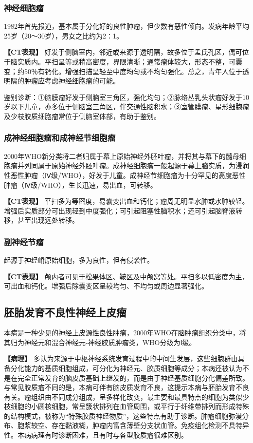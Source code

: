\subsubsection{神经细胞瘤}

1982年首先报道，基本属于分化好的良性肿瘤，但少数有恶性倾向。发病年龄平均25岁（20～30岁），男女之比约为2∶1。

\textbf{【CT表现】}
好发于侧脑室内，邻近或来源于透明隔，故多位于孟氏孔区，偶可位于脑实质内。平扫呈等或稍高密度，界限清晰；通常瘤体较大，形态不整，可囊变；约50％有钙化。增强扫描呈轻至中度均匀或不均匀强化。总之，青年人位于透明隔的肿瘤应考虑神经细胞瘤的可能。

鉴别诊断：①脑膜瘤好发于侧脑室三角区，强化均匀；②脉络丛乳头状瘤好发于10岁以下儿童，亦多位于侧脑室三角区，伴交通性脑积水；③室管膜瘤、星形细胞瘤及少枝胶质细胞瘤常位于侧脑室体部，有助于鉴别。

\subsubsection{成神经细胞瘤和成神经节细胞瘤}

2000年WHO新分类将二者归属于幕上原始神经外胚叶瘤，并将其与幕下的髓母细胞瘤并列同属于原始神经外胚叶瘤。成神经细胞瘤一般起源于幕上脑实质，为浸润性恶性肿瘤（Ⅳ级/WHO），好发于儿童。成神经节细胞瘤为十分罕见的高度恶性肿瘤（Ⅳ级/WHO），生长迅速，易出血，可转移。

\textbf{【CT表现】}
平扫多为等密度，易囊变出血和钙化；瘤周无明显水肿或水肿较轻。增强后实质部分可出现轻到中度强化；可引起阻塞性脑积水；还可引起脑脊液转移，甚至出现远处转移。

\subsubsection{副神经节瘤}

起源于神经嵴原始细胞，多为良性，但有侵袭性。

\textbf{【CT表现】}
颅内者可见于松果体区、鞍区及中颅窝等处。平扫多以低密度为主，可出血和钙化。增强后除囊变区呈较均匀、不均匀或周边显著强化。

\subsection{胚胎发育不良性神经上皮瘤}

本病是一种少见的神经上皮源性良性肿瘤，2000年WHO在脑肿瘤组织分类中，将其归为神经元和混合神经元-神经胶质肿瘤类，WHO分级为Ⅰ级。

\textbf{【病理】}
多认为来源于中枢神经系统发育过程中的中间生发层，这些细胞群由具备分化能力的基质细胞组成，可分化为神经元、胶质细胞等成分；本病还被认为不是在完全正常发育的脑皮质基础上继发的，而是由于神经基质细胞分化偏差所致。与常见胶质瘤不同的是，本病可伴有脑皮质发育不良，这提示本病与胚胎发育不良有关。瘤组织由不同成分组成，呈多样化改变，最主要和最具特点的细胞为类似少枝细胞的小圆核细胞，常呈簇状排列在血管周围，或平行于纤维带排列而形成特殊的结构模式，被称为“特殊胶质神经物质”，这些特点有助于诊断。肿瘤细胞弥漫分布、胞浆较空、存在黏液糊，肿瘤内富含薄壁分支状血管。免疫组化检测不具特异性。本病病理有时诊断困难，且有时与各型胶质瘤很难区别。

